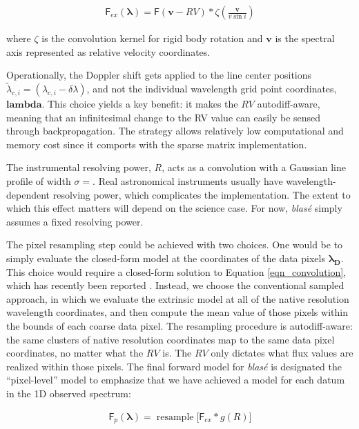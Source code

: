 \documentclass[modern]{aastex631}
\DeclareMathOperator{\resample}{resample}
\begin{document}
\begin{eqnarray}
    \mathsf{F}_{ex}(\bm{\lambda}) = \mathsf{F}(\bm{v}-RV) * \zeta \left(\frac{\bm{v}}{v\sin{i}}\right) \label{eqn_convolution}
\end{eqnarray}

where $\zeta$ is the convolution kernel for rigid body rotation  and $\bm{v}$ is the spectral axis represented as relative velocity coordinates.

Operationally, the Doppler shift gets applied to the line center positions $\tilde \lambda_{c,i} = (\lambda_{c,i}-\delta \lambda)$, and not the individual wavelength grid point coordinates, $\bm{lambda}$. This choice yields a key benefit: it makes the $RV$ autodiff-aware, meaning that an infinitesimal change to the RV value can easily be sensed through backpropagation.  The strategy allows relatively low computational and memory cost since it comports with the sparse matrix implementation.

The instrumental resolving power, $R$, acts as a convolution with a Gaussian line profile of width $\sigma=$.  Real astronomical instruments usually have wavelength-dependent resolving power, which complicates the implementation.  The extent to which this effect matters will depend on the science case.  For now, \emph{blas\'e} simply assumes a fixed resolving power.

The pixel resampling step could be achieved with two choices.  One would be to simply evaluate the closed-form model at the coordinates of the data pixels $\bm{\lambda_D}$.  This choice would require a closed-form solution to Equation \ref{eqn_convolution}, which has recently been reported \citep{2021arXiv211006271L}.  Instead, we choose the conventional sampled approach, in which we evaluate the extrinsic model at all of the native resolution wavelength coordinates, and then compute the mean value of those pixels within the bounds of each coarse data pixel.  The resampling procedure is autodiff-aware: the same clusters of native resolution coordinates map to the same data pixel coordinates, no matter what the $RV$ is.  The $RV$ only dictates what flux values are realized within those pixels.  The final forward model for \emph{blas\'e} is designated the ``pixel-level'' model to emphasize that we have achieved a model for each datum in the 1D observed spectrum:

\begin{eqnarray}
    \mathsf{F}_{p}(\bm{\lambda}) = \resample{\Big[\mathsf{F}_{ex} * g(R) \Big]} \label{eqn_final_model}
\end{eqnarray}
\end{document}
